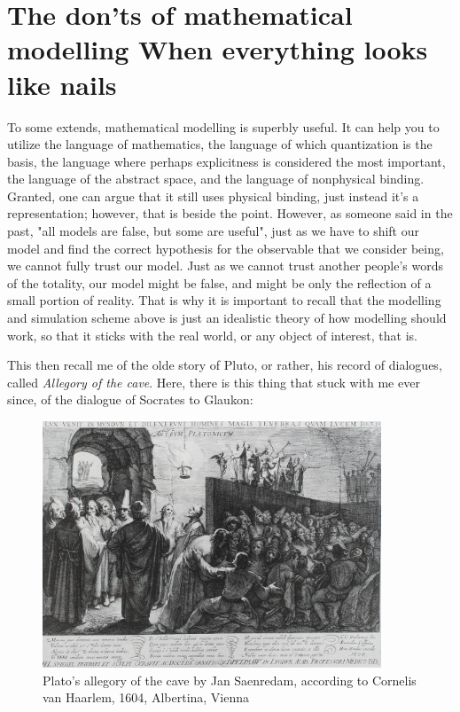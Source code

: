 \section[The don'ts of mathematical modelling]{The don'ts of mathematical modelling {\small When everything looks like nails}}
To some extends, mathematical modelling is superbly useful. It can help you to utilize the language of mathematics, the language of which quantization is the basis, the language where perhaps explicitness is considered the most important, the language of the abstract space, and the language of nonphysical binding. Granted, one can argue that it still uses physical binding, just instead it's a representation; however, that is beside the point. However, as someone said in the past, "all models are false, but some are useful", just as we have to shift our model and find the correct hypothesis for the observable that we consider being, we cannot fully trust our model. Just as we cannot trust another people's words of the totality, our model might be false, and might be only the reflection of a small portion of reality. That is why it is important to recall that the modelling and simulation scheme above is just an idealistic theory of how modelling should work, so that it sticks with the real world, or any object of interest, that is. 

This then recall me of the olde story of Pluto, or rather, his record of dialogues, called \textit{Allegory of the cave}. Here, there is this thing that stuck with me ever since, of the dialogue of Socrates to Glaukon:

\begin{figure}[h!]
    \centering
    \includegraphics[width=0.9\textwidth]{img/Platon_Cave_Sanraedam_1604.jpg}
    \caption{Plato's allegory of the cave by Jan Saenredam, according to Cornelis van Haarlem, 1604, Albertina, Vienna}
    \label{fig:PlatoAllegory}
\end{figure}


